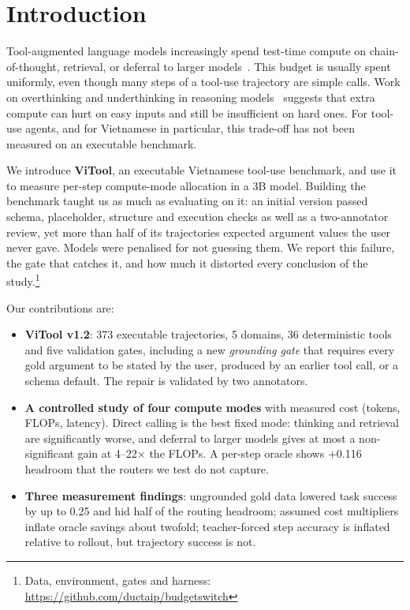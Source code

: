 \documentclass[conference,a4paper]{IEEEtran}
\newcommand{\repourl}{\url{https://github.com/ductaip/budgetswitch}} %
\begin{document}
\section{Introduction}
Tool-augmented language models increasingly spend test-time compute on
chain-of-thought, retrieval, or deferral to larger models~\cite{snell2024}.
This budget is usually spent uniformly, even though many steps of a tool-use
trajectory are simple calls. Work on overthinking and underthinking in
reasoning models~\cite{chen2024overthink,wang2025underthink,ttcsurvey2025}
suggests that extra compute can hurt on easy inputs and still be insufficient
on hard ones. For tool-use agents, and for Vietnamese in particular, this
trade-off has not been measured on an executable benchmark.

We introduce \textbf{ViTool}, an executable Vietnamese tool-use benchmark, and
use it to measure per-step compute-mode allocation in a 3B model. Building the
benchmark taught us as much as evaluating on it: an initial version passed
schema, placeholder, structure and execution checks as well as a
two-annotator review, yet more than half of its trajectories expected argument
values the user never gave. Models were penalised for not guessing them. We
report this failure, the gate that catches it, and how much it distorted every
conclusion of the study.\footnote{Data, environment, gates and harness:
\repourl}

Our contributions are:
\begin{itemize}
\item \textbf{ViTool v1.2}: 373 executable trajectories, 5 domains, 36
deterministic tools and five validation gates, including a new
\emph{grounding gate} that requires every gold argument to be stated by the
user, produced by an earlier tool call, or a schema default. The repair is
validated by two annotators.
\item \textbf{A controlled study of four compute modes} with measured cost
(tokens, FLOPs, latency). Direct calling is the best fixed mode: thinking and
retrieval are significantly worse, and deferral to larger models gives at most a
non-significant gain at 4--22$\times$ the FLOPs. A per-step oracle
shows +0.116 headroom that the routers we test do not capture.
\item \textbf{Three measurement findings}: ungrounded gold data lowered task
success by up to 0.25 and hid half of the routing headroom; assumed cost
multipliers inflate oracle savings about twofold; teacher-forced step accuracy
is inflated relative to rollout, but trajectory success is not.
\end{itemize}
\end{document}
